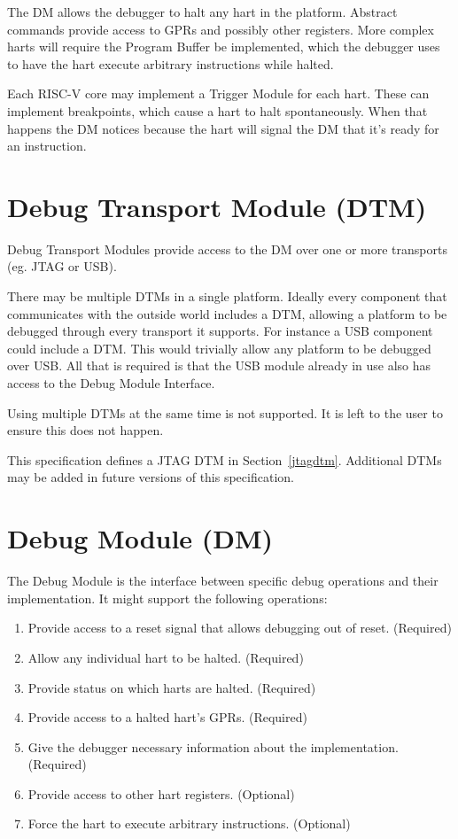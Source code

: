 \documentclass{article}
\newenvironment{steps}[1]
{
   \vspace{1ex}
   \noindent
   #1
   \begin{enumerate}[nosep]
}
{
   \end{enumerate}
   \vspace{1ex}
}
\begin{document}
The DM allows the debugger to halt any hart in the platform. Abstract commands
provide access to GPRs and possibly other registers. More complex harts will
require the Program Buffer be implemented, which the debugger uses to have the
hart execute arbitrary instructions while halted.

Each RISC-V core may implement a Trigger Module for each hart.  These can
implement breakpoints, which cause a hart to halt spontaneously.  When that
happens the DM notices because the hart will signal the DM that it's ready for
an instruction.

\section{Debug Transport Module (DTM)} \label{dtm}

Debug Transport Modules provide access to the DM over one or more transports
(eg. JTAG or USB).

There may be multiple DTMs in a single platform. Ideally every component that
communicates with the outside world includes a DTM, allowing a platform to be
debugged through every transport it supports.  For instance a USB component
could include a DTM. This would trivially allow any platform to be debugged
over USB. All that is required is that the USB module already in use also has
access to the Debug Module Interface.

Using multiple DTMs at the same time is not supported. It is left to the user
to ensure this does not happen.

This specification defines a JTAG DTM in Section~\ref{jtagdtm}. Additional DTMs
may be added in future versions of this specification.

\section{Debug Module (DM)} \label{dm}

\begin{steps}{The Debug Module is the interface between specific debug
    operations and their implementation. It might support the following
    operations:}
\item Provide access to a reset signal that allows debugging out of reset.
    (Required)
\item Allow any individual hart to be halted. (Required)
\item Provide status on which harts are halted. (Required)
\item Provide access to a halted hart's GPRs. (Required)
\item Give the debugger necessary information about the implementation.
    (Required)
\item Provide access to other hart registers. (Optional)
\item Force the hart to execute arbitrary instructions. (Optional)
\end{steps}
\end{document}
